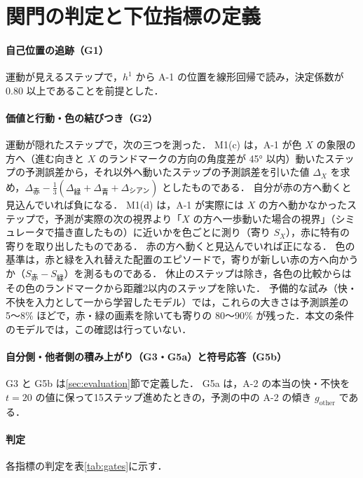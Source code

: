 \section{関門の判定と下位指標の定義}\label{app:gates}

\paragraph{自己位置の追跡（G1）}
運動が見えるステップで，$h^1$ から A-1 の位置を線形回帰で読み，決定係数が 0.80 以上であることを前提とした．

\paragraph{価値と行動・色の結びつき（G2）}
運動が隠れたステップで，次の三つを測った．
M1(c) は，A-1 が色 $X$ の象限の方へ（進む向きと $X$ のランドマークの方向の角度差が 45° 以内）動いたステップの予測誤差から，それ以外へ動いたステップの予測誤差を引いた値 $\Delta_X$ を求め，$\Delta_{\text{赤}}-\frac13(\Delta_{\text{緑}}+\Delta_{\text{青}}+\Delta_{\text{シアン}})$ としたものである．
自分が赤の方へ動くと見込んでいれば負になる．
M1(d) は，A-1 が実際には $X$ の方へ動かなかったステップで，予測が実際の次の視界より「$X$ の方へ一歩動いた場合の視界」（シミュレータで描き直したもの）に近いかを色ごとに測り（寄り $S_X$），赤に特有の寄りを取り出したものである．
赤の方へ動くと見込んでいれば正になる．
色の基準は，赤と緑を入れ替えた配置のエピソードで，寄りが新しい赤の方へ向かうか（$S_{\text{赤}}-S_{\text{緑}}$）を測るものである．
休止のステップは除き，各色の比較からはその色のランドマークから距離2以内のステップを除いた．
予備的な試み（快・不快を入力として一から学習したモデル）では，これらの大きさは予測誤差の 5〜8\% ほどで，赤・緑の画素を除いても寄りの 80〜90\% が残った．本文の条件のモデルでは，この確認は行っていない．

\paragraph{自分側・他者側の積み上がり（G3・G5a）と符号応答（G5b）}
G3 と G5b は\ref{sec:evaluation}節で定義した．
G5a は，A-2 の本当の快・不快を $t=20$ の値に保って15ステップ進めたときの，予測の中の A-2 の傾き $g_{\mathrm{other}}$ である．

\paragraph{判定}
各指標の判定を表\ref{tab:gates}に示す．

\begin{table}[t]
  \centering
  \small
  \caption{段階Iの関門の判定}
  \label{tab:gates}
  
\end{table}